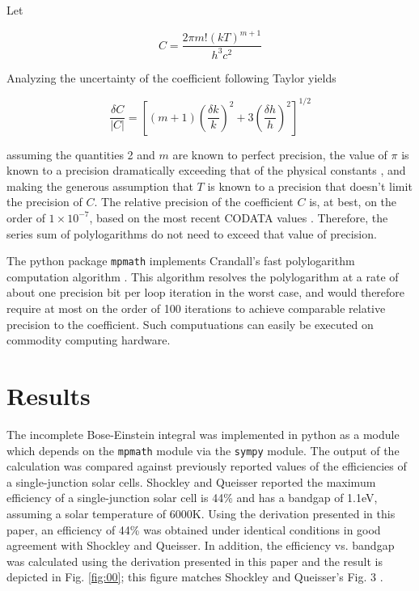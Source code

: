 \documentclass[aip,jap,reprint]{revtex4-1}
\begin{document}
Let

\begin{equation} \label{eq:52}
C = \frac{2 \pi m! (kT)^{m+1}}{h^{3}c^{2}}
\end{equation}

\noindent Analyzing the uncertainty of the coefficient following Taylor \cite{9780935702422} yields

\begin{equation} \label{eq:53}
\frac{\delta C}{|C|} = \left[ (m+1) \left( \frac{\delta k}{k} \right)^{2} + 3 \left( \frac{\delta h}{h} \right)^{2} \right]^{1/2}
\end{equation}

\noindent assuming the quantities 2 and $m$ are known to perfect precision, the value of $\pi$ is known to a precision dramatically exceeding that of the physical constants \cite{http://www.numberworld.org/misc_runs/pi-12t}, and making the generous assumption that $T$ is known to a precision that doesn't limit the precision of $C$. The relative precision of the coefficient $C$ is, at best, on the order of $1 \times 10^{-7}$, based on the most recent CODATA values \cite{10.1103/RevModPhys.84.1527}. Therefore, the series sum of polylogarithms do not need to exceed that value of precision.

The python package \texttt{mpmath} \cite{mpmath} implements Crandall's fast polylogarithm computation algorithm \cite{http://academic.reed.edu/physics/faculty/crandall/papers/Polylog}. This algorithm resolves the polylogarithm at a rate of about one precision bit per loop iteration in the worst case, and would therefore require at most on the order of 100 iterations to achieve comparable relative precision to the coefficient. Such computuations can easily be executed on commodity computing hardware.


\section{Results}
The incomplete Bose-Einstein integral was implemented in python as a module \cite{10.6084/m9.figshare.1229713} which depends on the \texttt{mpmath} module via the \texttt{sympy} module. The output of the calculation was compared against previously reported values of the efficiencies of a single-junction solar cells. Shockley and Queisser \cite{10.1063/1.1736034} reported the maximum efficiency of a single-junction solar cell is 44\% and has a bandgap of 1.1eV, assuming a solar temperature of 6000K. Using the derivation presented in this paper, an efficiency of 44\% was obtained under identical conditions in good agreement with Shockley and Queisser. In addition, the efficiency vs. bandgap was calculated using the derivation presented in this paper and the result is depicted in Fig. \ref{fig:00}; this figure matches Shockley and Queisser's Fig. 3 \cite{10.1063/1.1736034}.
\end{document}
